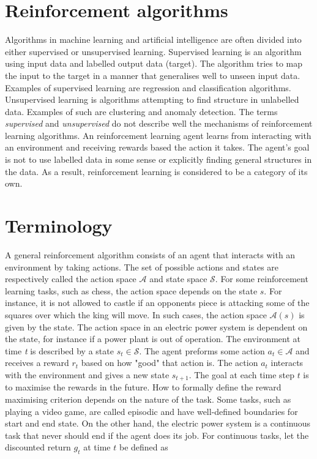 \documentclass[class=book, crop=false]{standalone}
\begin{document}
\section{Reinforcement algorithms}
Algorithms in machine learning and artificial intelligence are often divided into either supervised or unsupervised learning. Supervised learning is an algorithm using input data and labelled output data (target). The algorithm tries to map the input to the target in a manner that generalises well to unseen input data. Examples of supervised learning are regression and classification algorithms. Unsupervised learning is algorithms attempting to find structure in unlabelled data. Examples of such are clustering and anomaly detection. The terms \textit{supervised} and \textit{unsupervised} do not describe well the mechanisms of reinforcement learning algorithms. An reinforcement learning agent learns from interacting with an environment and receiving rewards based the action it takes. The agent's goal is not to use labelled data in some sense or explicitly finding general structures in the data. As a result, reinforcement learning is considered to be a category of its own\cite{Sutton1998}. 

\section{Terminology}
A general reinforcement algorithm consists of an agent that interacts with an environment by taking actions. The set of possible actions and states are respectively called the action space $\mathcal{A}$ and state space $\mathcal{S}$. For some reinforcement learning tasks, such as chess, the action space depends on the state $s$. For instance, it is not allowed to castle if an opponents piece is attacking some of the squares over which the king will move. In such cases, the action space $\mathcal{A}(s)$ is given by the state. The action space in an electric power system is dependent on the state, for instance if a power plant is out of operation. The environment at time \textit{t} is described by a state $s_{t} \in \mathcal{S}$. The agent preforms some action $a_{t}\in \mathcal{A}$ and receives a reward $r_{t}$ based on how "good" that action is. The action $a_{t}$ interacts with the environment and gives a new state $s_{t+1}$. The goal at each time step $t$ is to maximise the rewards in the future. How to formally define the reward maximising criterion depends on the nature of the task. Some tasks, such as playing a video game, are called episodic and have well-defined boundaries for start and end state. On the other hand, the electric power system is a continuous task that never should end if the agent does its job. For continuous tasks, let the discounted return $g_{t}$ at time $t$ be defined as 
\end{document}
